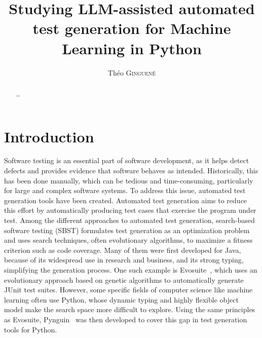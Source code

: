 \documentclass{article}
\title{Studying LLM-assisted automated test generation for Machine Learning in Python}
\author{Théo \textsc{Ginguené}}
\newif\ifdetails
\begin{document}
\maketitle

\begin{abstract}
\dots

\end{abstract}

\ifdetails
\begin{otherlanguage}{french}
    \begin{abstract}
        \dots

    \end{abstract}
\end{otherlanguage}
\fi

\tableofcontents
\newpage

\section{Introduction}\label{sec:introduction}
Software testing is an essential part of software development, as it helps detect defects and provides evidence that software behaves as intended. Historically, this has been done manually, which can be tedious and time-consuming, particularly for large and complex software systems.
To address this issue, automated test generation tools have been created. Automated test generation aims to reduce this effort by automatically producing test cases that exercise the program under test. Among the different approaches to automated test generation, search-based software testing (SBST) formulates test generation as an optimization problem and uses search techniques, often evolutionary algorithms, to maximize a fitness criterion such as code coverage.
Many of them were first developed for Java, because of its widespread use in research and business, and its strong typing, simplifying the generation process.
One such example is Evosuite~\cite{ESECFSE11}, which uses an evolutionary approach based on genetic algorithms to automatically generate JUnit test suites.
However, some specific fields of computer science like machine learning often use Python, whose dynamic typing and highly flexible object model make the search space more difficult to explore. Using the same principles as Evosuite, Pynguin~\cite{Lukasczyk_Pynguin_Automated_Unit_2022} was then developed to cover this gap in test generation tools for Python.
\end{document}
